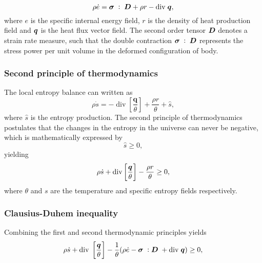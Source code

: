 \begin{equation}
    \rho\dot e = \bm{\sigma}\;:\;\bm{D} + \rho r -\text{div}\;\bm{q},
\end{equation}
where $e$ is the specific internal energy field, $r$ is the density of heat production field and $\bm{q}$ is the heat flux vector field.
The second order tensor $\bm{D}$ denotes a strain rate measure, such that the double contraction $\bm{\sigma}\;:\;\bm{D}$ represents the stress power per unit volume in the deformed configuration of body.

\subsubsection{Second principle of thermodynamics}

The local entropy balance can written as
\begin{equation}
  \rho \dot s = -\operatorname{div}\left[\frac{\bm q}{\theta}\right] + \frac{\rho r}{\theta} + \hat{s},
\end{equation}
where \(\hat{s}\) is the entropy production.
The second principle of thermodynamics postulates that the changes in the entropy in the universe can never be negative, which is mathematically expressed by
\begin{equation}
  \hat s \geq 0,
\end{equation}
yielding
\begin{equation}
    \rho\dot s +\text{div}\left[\frac{\bm{q}}{\theta}\right] -\frac{\rho r}{\theta} \geq 0,
\end{equation}
   where $\theta$ and $s$ are the temperature and specific entropy fields respectively.

\subsubsection{Clausius-Duhem inequality}

Combining the first and second thermodynamic principles yields
\begin{equation}
    \rho\dot s + \text{div}\;\left[\frac{\bm{q}}{\theta}\right] -\frac{1}{\theta}(\rho\dot e -\bm{\sigma}\;:\bm D\; +\text{div}\;\bm{q})\geq 0,
\end{equation}

